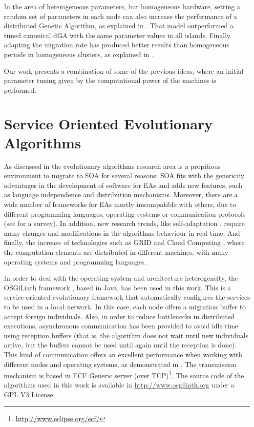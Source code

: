 In the area of heterogeneous parameters, but homogeneous hardware, setting a random set of parameters in each node can also increase the performance of a distributed Genetic Algorithm, as explained in \cite{HETEROGENEOUSPARAMETERS}. That model outperformed a tuned canonical dGA with the same parameter values in all islands. Finally, adapting the migration rate has produced better results than homogeneous periods in homogeneous clusters, as explained in \cite{HETEROGENEOUSMIGRATION}.

 Our work presents a combination of some of the previous ideas, where an initial parameter tuning given by the computational power of the machines is performed. %


\section{Service Oriented Evolutionary Algorithms}
\label{sec:soaea}



As discussed in \cite{SOASOCO} the evolutionary algorithms research area is a propitious environment to migrate to SOA for several reasons: SOA fits with the genericity advantages in the development of software for EAs \citep{GENERICITY05} and adds new features, such as language independence and  distribution mechanisms. Moreover, there are a wide number of frameworks for EAs mostly imcompatible with others, due to different programming languages, operating systems or communication protocols (see \cite{SURVEYMOFS} for a survey). In addition, new research trends, like self-adaptation \citep{SELFSTAR}, require many changes and modifications in the algorithms behaviour in real-time. And finally, the increase of technologies such as GRID and Cloud Computing \citep{CLOUD}, where the computation elements are distributed in different machines, with many operating systems and programming languages.

In order to deal with the operating system and architecture heterogeneity, the OSGiLiath framework \cite{SOASOCO}, based in Java, has been used in this work. This is a service-oriented evolutionary framework that automatically configures the services to be used in a local network. In this case, each node offers a migration buffer to accept foreign individuals. Also, in order to reduce bottlenecks in distributed executions, asynchronous communication has been provided to avoid idle time using reception buffers (that is, the algorithm does not wait until new individuals arrive, but the buffers cannot be used until again until the reception is done). This kind of communication offers an excellent performance when working with different nodes and operating systems, as demonstrated in \cite{HETEROGENEOUSHARD}. The transmission mechanism is based in ECF Generic server (over TCP)\footnote{\url{http://www.eclipse.org/ecf/}}. The source code of the algorithms used in this work is available in \url{http://www.osgiliath.org} under a GPL V3 License.



